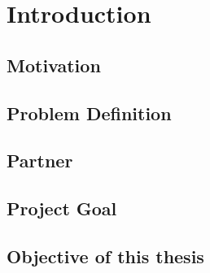 \chapter{Introduction}
\label{cha:introduction}

\cite{Srivastava_1992}
\section{Motivation}
\section{Problem Definition}
\section{Partner}
\section{Project Goal}
\section{Objective of this thesis}
